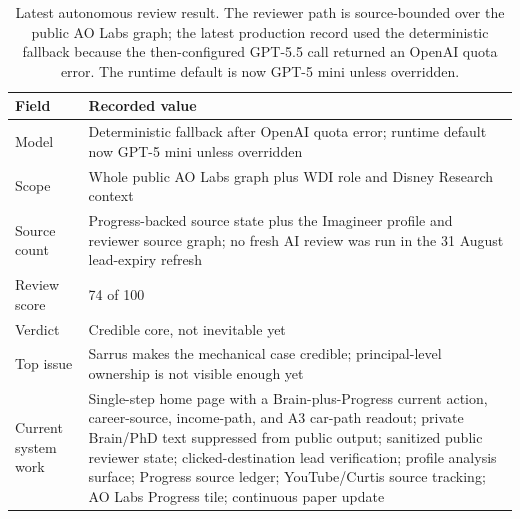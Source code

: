 \documentclass[12pt,letterpaper]{article}
\begin{document}
\begin{table}[tbp]
\centering
\small
\caption{Latest autonomous review result. The reviewer path is source-bounded over the public AO Labs graph; the latest production record used the deterministic fallback because the then-configured GPT-5.5 call returned an OpenAI quota error. The runtime default is now GPT-5 mini unless overridden.}
\label{tab:reviewer}
\begin{tabularx}{\textwidth}{L{0.30\textwidth}Y}
\toprule
{}
\textbf{Field} & \textbf{Recorded value} \\
\midrule
Model & Deterministic fallback after OpenAI quota error; runtime default now GPT-5 mini unless overridden \\
Scope & Whole public AO Labs graph plus WDI role and Disney Research context \\
Source count & Progress-backed source state plus the Imagineer profile and reviewer source graph; no fresh AI review was run in the 31 August lead-expiry refresh \\
Review score & 74 of 100 \\
Verdict & Credible core, not inevitable yet \\
Top issue & Sarrus makes the mechanical case credible; principal-level ownership is not visible enough yet \\
Current system work & Single-step home page with a Brain-plus-Progress current action, career-source, income-path, and A3 car-path readout; private Brain/PhD text suppressed from public output; sanitized public reviewer state; clicked-destination lead verification; profile analysis surface; Progress source ledger; YouTube/Curtis source tracking; AO Labs Progress tile; continuous paper update \\
\bottomrule
\end{tabularx}
\end{table}
\end{document}
